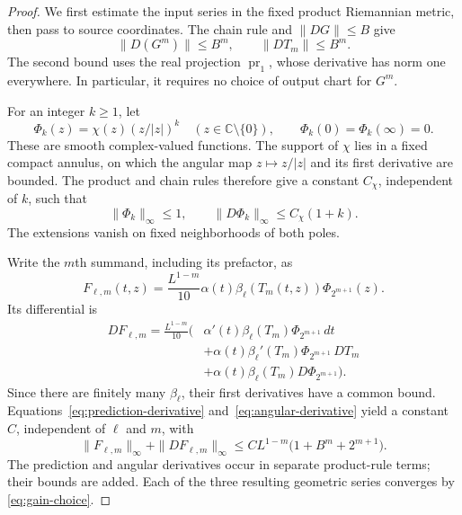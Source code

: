 \begin{proof}
We first estimate the input series in the fixed product Riemannian
metric, then pass to source coordinates.  The chain rule and
$\|DG\|\le B$ give
\begin{equation}
\label{eq:prediction-derivative}
 \|D(G^m)\|\le B^m,\qquad \|DT_m\|\le B^m.
\end{equation}
The second bound uses the real projection $\operatorname{pr}_1$, whose
derivative has norm one everywhere.  In particular, it requires no
choice of output chart for $G^m$.

For an integer $k\ge1$, let
\[
 \Phi_k(z)=\chi(z)(z/|z|)^k\quad(z\in\mathbb C\setminus\{0\}),
 \qquad \Phi_k(0)=\Phi_k(\infty)=0.
\]
These are smooth complex-valued functions.  The support of $\chi$ lies
in a fixed compact annulus, on which the angular map $z\mapsto z/|z|$
and its first derivative are bounded.  The product and chain rules
therefore give a constant $C_\chi$, independent of $k$, such that
\begin{equation}
\label{eq:angular-derivative}
 \|\Phi_k\|_\infty\le1,\qquad
 \|D\Phi_k\|_\infty\le C_\chi(1+k).
\end{equation}
The extensions vanish on fixed neighborhoods of both poles.

Write the $m$th summand, including its prefactor, as
\[
 F_{\ell,m}(t,z)=\frac{L^{1-m}}{10}
             \alpha(t)\beta_\ell(T_m(t,z))\Phi_{2^{m+1}}(z).
\]
Its differential is
\begin{align*}
 DF_{\ell,m}=\frac{L^{1-m}}{10}\bigl(&
 \alpha'(t)\beta_\ell(T_m)\Phi_{2^{m+1}}\,dt\\
 &+\alpha(t)\beta_\ell'(T_m)\Phi_{2^{m+1}}\,DT_m\\
 &+\alpha(t)\beta_\ell(T_m)D\Phi_{2^{m+1}}\bigr).
\end{align*}
Since there are finitely many $\beta_\ell$, their first derivatives have
a common bound.  Equations~\eqref{eq:prediction-derivative}
and~\eqref{eq:angular-derivative} yield a constant $C$, independent of
$\ell$ and $m$, with
\begin{equation}
\label{eq:input-derivative-bound}
 \|F_{\ell,m}\|_\infty+\|DF_{\ell,m}\|_\infty
 \le C L^{1-m}\bigl(1+B^m+2^{m+1}\bigr).
\end{equation}
The prediction and angular derivatives occur in separate product-rule
terms; their bounds are added.  Each of the three resulting geometric
series converges by \eqref{eq:gain-choice}.


\end{proof}
